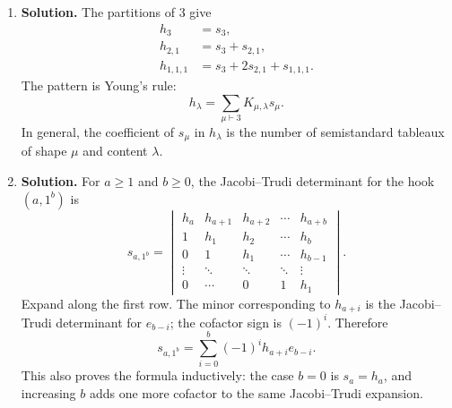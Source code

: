 \documentclass{article}
\begin{document}
\begin{enumerate}
\item \textbf{Solution.}
The partitions of $3$ give
\[
\boxed{\begin{aligned}
h_3&=s_3,\\
h_{2,1}&=s_3+s_{2,1},\\
h_{1,1,1}&=s_3+2s_{2,1}+s_{1,1,1}.
\end{aligned}}
\]
The pattern is Young's rule:
\[
\boxed{h_\lambda=\sum_{\mu\vdash3}K_{\mu,\lambda}s_\mu.}
\]
In general, the coefficient of $s_\mu$ in $h_\lambda$ is the number
of semistandard tableaux of shape $\mu$ and content $\lambda$.

\item \textbf{Solution.}
For $a\geq1$ and $b\geq0$, the Jacobi--Trudi determinant for the hook
$(a,1^b)$ is
\[
s_{a,1^b}=
\begin{vmatrix}
h_a&h_{a+1}&h_{a+2}&\cdots&h_{a+b}\\
1&h_1&h_2&\cdots&h_b\\
0&1&h_1&\cdots&h_{b-1}\\
\vdots&\ddots&\ddots&\ddots&\vdots\\
0&\cdots&0&1&h_1
\end{vmatrix}.
\]
Expand along the first row.  The minor corresponding to $h_{a+i}$ is
the Jacobi--Trudi determinant for $e_{b-i}$; the cofactor sign is
$(-1)^i$.  Therefore
\[
\boxed{s_{a,1^b}
=\sum_{i=0}^b(-1)^ih_{a+i}e_{b-i}.}
\]
This also proves the formula inductively: the case $b=0$ is
$s_a=h_a$, and increasing $b$ adds one more cofactor to the same
Jacobi--Trudi expansion.

\end{enumerate}
\end{document}
